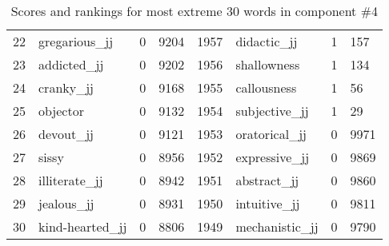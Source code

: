 \begin{table}[tbp]
\begin{tabular}{| rlr@{.}l | rlr@{.}l |}
    22 & gregarious\_jj & 0 & 9204    &    1957 & didactic\_jj & 1 & 157 \\
    23 & addicted\_jj & 0 & 9202    &    1956 & shallowness & 1 & 134 \\
    24 & cranky\_jj & 0 & 9168    &    1955 & callousness & 1 & 56 \\
    25 & objector & 0 & 9132    &    1954 & subjective\_jj & 1 & 29 \\
    26 & devout\_jj & 0 & 9121    &    1953 & oratorical\_jj & 0 & 9971 \\
    27 & sissy & 0 & 8956    &    1952 & expressive\_jj & 0 & 9869 \\
    28 & illiterate\_jj & 0 & 8942    &    1951 & abstract\_jj & 0 & 9860 \\
    29 & jealous\_jj & 0 & 8931    &    1950 & intuitive\_jj & 0 & 9811 \\
    30 & kind-hearted\_jj & 0 & 8806    &    1949 & mechanistic\_jj & 0 & 9790 \\
    \hline
    \end{tabular}
    \caption{Scores and rankings for most extreme 30 words in component \#4} 
\end{table}
\clearpage
